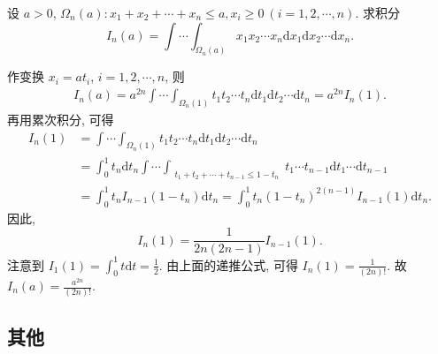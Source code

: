 \documentclass[../../main.tex]{subfiles}%
\begin{document}
\begin{example}
设 \( a > 0 \), \( \Omega_n(a) : x_1 + x_2 + \cdots + x_n \leqslant a, x_i \geqslant 0\ (i = 1,2,\cdots,n) \). 求积分
\[
I_n(a) = \int \cdots \int_{\Omega_n(a)} x_1 x_2 \cdots x_n \mathrm{d}x_1 \mathrm{d}x_2 \cdots \mathrm{d}x_n.
\]
\end{example}
\begin{solution}

作变换 \( x_i = a t_i \), \( i = 1,2,\cdots,n \), 则
\begin{align*}
I_n(a) = a^{2n} \int \cdots \int_{\Omega_n(1)} t_1 t_2 \cdots t_n \mathrm{d}t_1 \mathrm{d}t_2 \cdots \mathrm{d}t_n = a^{2n} I_n(1).
\end{align*}
再用累次积分, 可得
\begin{align*}
I_n(1) &= \int \cdots \int_{\Omega_n(1)} t_1 t_2 \cdots t_n \mathrm{d}t_1 \mathrm{d}t_2 \cdots \mathrm{d}t_n
\\
&= \int_0^1 t_n \mathrm{d}t_n \int \cdots \int_{\substack{t_1 + t_2 + \cdots + t_{n-1} \leqslant 1 - t_n}} t_1 \cdots t_{n-1} \mathrm{d}t_1 \cdots \mathrm{d}t_{n-1}
\\
&= \int_0^1 t_n I_{n-1}(1 - t_n) \mathrm{d}t_n = \int_0^1 t_n (1 - t_n)^{2(n-1)} I_{n-1}(1) \mathrm{d}t_n.
\end{align*}
因此,
\[
I_n(1) = \frac{1}{2n(2n - 1)} I_{n-1}(1).
\]
注意到 \( I_1(1) = \int_0^1 t \mathrm{d}t = \frac{1}{2} \). 由上面的递推公式, 可得 \( I_n(1) = \frac{1}{(2n)!} \). 故 \( I_n(a) = \frac{a^{2n}}{(2n)!} \).

\end{solution}












\subsection{其他}
\end{document}
